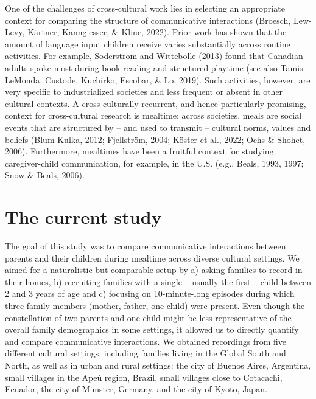 \documentclass[
  man,floatsintext]{apa6}
\begin{document}
One of the challenges of cross-cultural work lies in selecting an appropriate context for comparing the structure of communicative interactions (Broesch, Lew-Levy, Kärtner, Kanngiesser, \& Kline, 2022). Prior work has shown that the amount of language input children receive varies substantially across routine activities. For example, Soderstrom and Wittebolle (2013) found that Canadian adults spoke most during book reading and structured playtime (see also Tamis-LeMonda, Custode, Kuchirko, Escobar, \& Lo, 2019). Such activities, however, are very specific to industrialized societies and less frequent or absent in other cultural contexts. A cross-culturally recurrent, and hence particularly promising, context for cross-cultural research is mealtime: across societies, meals are social events that are structured by -- and used to transmit -- cultural norms, values and beliefs (Blum-Kulka, 2012; Fjellström, 2004; Köster et al., 2022; Ochs \& Shohet, 2006). Furthermore, mealtimes have been a fruitful context for studying caregiver-child communication, for example, in the U.S. (e.g., Beals, 1993, 1997; Snow \& Beals, 2006).

\hypertarget{the-current-study}{%
\section{The current study}\label{the-current-study}}

The goal of this study was to compare communicative interactions between parents and their children during mealtime across diverse cultural settings. We aimed for a naturalistic but comparable setup by a) asking families to record in their homes, b) recruiting families with a single -- usually the first -- child between 2 and 3 years of age and c) focusing on 10-minute-long episodes during which three family members (mother, father, one child) were present. Even though the constellation of two parents and one child might be less representative of the overall family demographics in some settings, it allowed us to directly quantify and compare communicative interactions. We obtained recordings from five different cultural settings, including families living in the Global South and North, as well as in urban and rural settings: the city of Buenos Aires, Argentina, small villages in the Apeú region, Brazil, small villages close to Cotacachi, Ecuador, the city of Münster, Germany, and the city of Kyoto, Japan.
\end{document}
